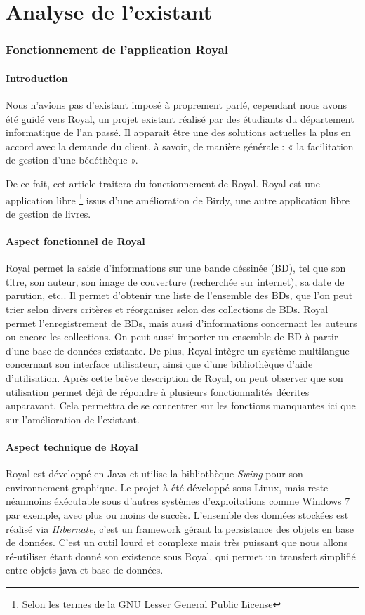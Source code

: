 \part{Analyse de l'existant}


\section{Fonctionnement de l'application Royal}

\subsection{Introduction}
Nous n'avions pas d'existant imposé à proprement parlé, cependant nous avons été guidé vers Royal, un projet existant réalisé par des étudiants du département informatique de l'an passé.
Il apparait être une des solutions actuelles la plus en accord avec la demande du client, à savoir, de manière générale : « la facilitation de gestion d'une bédéthèque ».

De ce fait, cet article traitera du fonctionnement de Royal.
Royal est une application 
libre \footnote{Selon les termes de la GNU Lesser General Public License}
issus d'une amélioration de Birdy, une autre application libre de gestion de livres.

\subsection{Aspect fonctionnel de Royal}
Royal permet la saisie d'informations sur une bande déssinée (BD), tel que son titre, son auteur, son image de couverture (recherchée sur internet), sa date de parution, etc..
Il permet d'obtenir une liste de l'ensemble des BDs, que l'on peut trier selon divers critères et réorganiser selon des collections de BDs.
Royal permet l'enregistrement de BDs, mais aussi d'informations concernant les auteurs ou encore les collections.
On peut aussi importer un ensemble de BD à partir d'une base de données existante.
De plus, Royal intègre un système multilangue concernant son interface utilisateur, ainsi que d'une bibliothèque d'aide d'utilisation.
Après cette brève description de Royal, on peut observer que son utilisation permet déjà de répondre à plusieurs fonctionnalités décrites auparavant. Cela permettra de se concentrer sur les fonctions manquantes ici que sur l'amélioration de l'existant.

\subsection{Aspect technique de Royal}
Royal est développé en Java et utilise la bibliothèque \emph{Swing} pour son environnement graphique. 
Le projet à été développé sous Linux, mais reste néanmoins éxécutable sous d'autres systèmes d'exploitations comme Windows 7 par exemple, avec plus ou moins de succès. 
L'ensemble des données stockées est réalisé via \emph{Hibernate}, c'est un framework gérant la persistance des objets en base de données. 
C'est un outil lourd et complexe mais très puissant que nous allons ré-utiliser étant donné son existence sous Royal, qui permet un transfert simplifié entre objets java et base de données.


